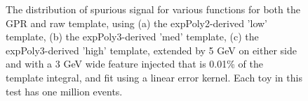\begin{figure} 
\begin{center}

\caption{The distribution of spurious signal for various functions for both the GPR and raw template, using (a) the expPoly2-derived 'low' template, (b) the expPoly3-derived 'med' template, (c) the expPoly3-derived 'high' template, extended by 5 GeV on either side and with a 3 GeV wide feature injected that is 0.01\% of the template integral, and fit using a linear error kernel. Each toy in this test has one million events.}
\label{fig:linearkernel_lowpt_100_Siginj}
\end{center}
\end{figure}


